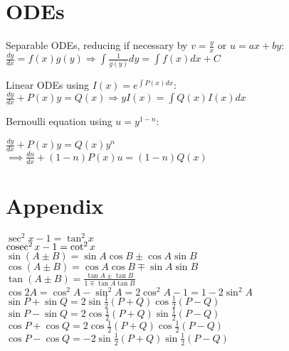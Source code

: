 \documentclass[12pt, a4paper]{article}
\begin{document}
\begin{multicols*}{4}
\section{ODEs}
Separable ODEs, reducing if necessary by $\displaystyle v=\frac{y}{x}$ or $u=ax+by$:\\
\mbox{$ \frac{dy}{dx} = f(x)g(y)\Rightarrow \int \frac{1}{g(y)}dy = \int f(x) dx + C$}

Linear ODEs using $I(x) = e^{\int P(x) dx}$:\\
\mbox{$ \frac{dy}{dx} + P(x)y = Q(x)\Rightarrow yI(x) = \int Q(x)I(x)dx$}

Bernoulli equation using $u=y^{1-n}$:\\
{\centering
  $ \frac{dy}{dx} + P(x)y = Q(x)y^n$\\$\implies \frac{du}{dx} + (1-n)P(x)u=(1-n)Q(x)$
\par}
\section*{Appendix}
{\centering
  $\sec^2x-1=\tan^2x$\\
  $\operatorname{cosec}^2x-1=\cot^2x$\\
  $\sin(A\pm B) = \sin A\cos B \pm \cos A\sin B$\\
  $\cos(A\pm B) = \cos A\cos B \mp \sin A\sin B$\\
  $\displaystyle \tan(A\pm B) = \frac{\tan A \pm \tan B}{1 \mp \tan A\tan B}$\\
  $\cos 2A = \cos^2A -\sin^2A = 2\cos^2A-1 = 1-2\sin^2A$\\
  $\sin P + \sin Q = 2\sin \frac{1}{2}(P+Q)\cos \frac{1}{2}(P-Q)$\\
  $\sin P - \sin Q = 2\cos \frac{1}{2}(P+Q)\sin \frac{1}{2}(P-Q)$\\
  $\cos P + \cos Q = 2\cos \frac{1}{2}(P+Q)\cos \frac{1}{2}(P-Q)$\\
  $\cos P - \cos Q = -2\sin \frac{1}{2}(P+Q)\sin \frac{1}{2}(P-Q)$\\
\par}
\end{multicols*}
\end{document}
